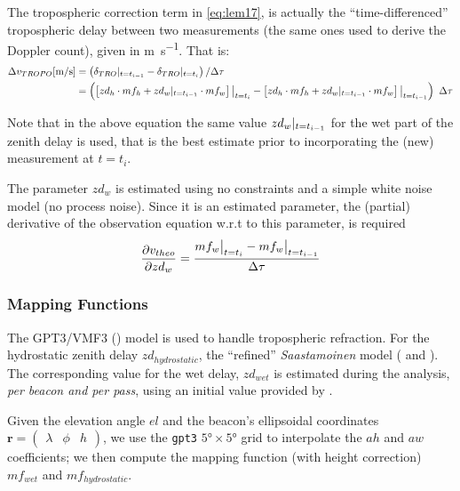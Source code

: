 The tropospheric correction term in \autoref{eq:lem17}, is actually the ``time-differenced'' 
tropospheric delay between two measurements (the same ones used to derive the 
Doppler count), given in \si{\m \per \s}. That is:
\begin{equation}\label{eq:dtrop-diff}
  \begin{aligned}
    \Delta v_{TROPO} [\si{\m \per \s}] 
      &= \left( \delta _{TRO} \at{t=t_{i-1}} - \delta _{TRO} \at{t=t_{i}} \right) / \Delta \tau\\
      &= \left( \left[ zd_{h} \cdot mf_{h} + zd_{w}\at{t=t_{i-1}} \cdot mf_{w} \right]\at[\big]{t=t_i} - 
        \left[ zd_{h} \cdot mf_{h} + zd_{w}\at{t=t_{i-1}} \cdot mf_{w} \right]\at[\big]{t=t_{i-1}} \right) \ \Delta \tau
  \end{aligned}
\end{equation}

Note that in the above equation the same value $zd_{w}\at{t=t_{i-1}}$ 
for the wet part of the zenith delay is used, that is the best estimate prior to 
incorporating the (new) measurement at $t=t_i$.

The parameter $zd_{w}$ is estimated using no constraints and a simple white 
noise model (no process noise). Since it is an estimated parameter, 
the (partial) derivative of the observation equation w.r.t to this parameter, 
is required
\begin{equation}\label{eq:partials-zwd}
  \frac{\partial v_{theo}}{\partial zd_{w}} = \frac{mf_{w}\at[\big]{t=t_i} 
    - mf_{w}\at[\big]{t=t_{i-1}}}{\Delta \tau}
\end{equation}

\iffalse
\subsubsection{Mapping Functions}
The GPT3/VMF3 (\cite{Landskron2018}) model is used to handle tropospheric refraction. 
For the hydrostatic zenith delay $zd_{hydrostatic}$, the ``refined'' 
\emph{Saastamoinen} model (\cite{Davisetal85} and \cite{Saastamoinen72}). 
The corresponding value for the wet delay, $zd_{wet}$ is estimated during the 
analysis, \emph{per beacon and per pass}, using an initial value provided by 
\cite{Askneetal87}.

Given the elevation angle $el$ and the beacon's ellipsoidal coordinates 
$\bm{r}=\begin{pmatrix} \lambda & \phi & h\end{pmatrix}$, we use the \texttt{gpt3} 
$\ang{5} \times \ang{5}$ grid to interpolate the $ah$ and $aw$ coefficients; 
we then compute the mapping function (with height correction) $mf_{wet}$ and 
$mf_{hydrostatic}$.

